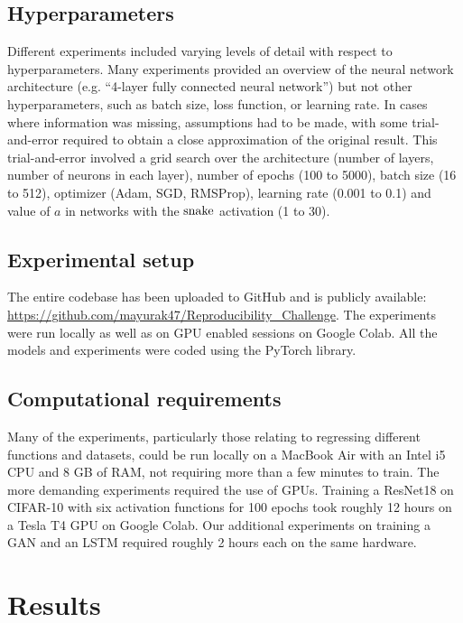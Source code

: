 \subsection{Hyperparameters}

Different experiments included varying levels of detail with respect to hyperparameters. Many experiments provided an overview of the neural network architecture (e.g. ``4-layer fully connected neural network'') but not other hyperparameters, such as batch size, loss function, or learning rate. In cases where information was missing, assumptions had to be made, with some trial-and-error required to obtain a close approximation of the original result. This trial-and-error involved a grid search over the architecture (number of layers, number of neurons in each layer), number of epochs (100 to 5000), batch size (16 to 512), optimizer (Adam, SGD, RMSProp), learning rate (0.001 to 0.1) and value of $a$ in networks with the $ \operatorname{snake} $ activation (1 to 30).

\subsection{Experimental setup}

The entire codebase has been uploaded to GitHub and is publicly available: \url{https://github.com/mayurak47/Reproducibility_Challenge}. The experiments were run locally as well as on GPU enabled sessions on Google Colab. All the models and experiments were coded using the PyTorch library.

\subsection{Computational requirements}

Many of the experiments, particularly those relating to regressing different functions and datasets, could be run locally on a MacBook Air with an Intel i5 CPU and 8 GB of RAM, not requiring more than a few minutes to train. The more demanding experiments required the use of GPUs. Training a ResNet18 on CIFAR-10 with six activation functions for 100 epochs took roughly 12 hours on a Tesla T4 GPU on Google Colab. Our additional experiments on training a GAN and an LSTM required roughly 2 hours each on the same hardware. 

\section{Results}

